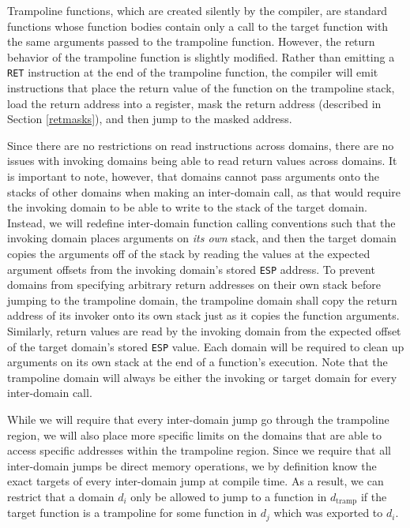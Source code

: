 \documentclass[12pt]{IEEEtran}
\begin{document}
Trampoline functions, which are created silently by the compiler, are standard functions whose function bodies contain only a call to the target function with the same arguments passed to the trampoline function. However, the return behavior of the trampoline function is slightly modified. Rather than emitting a \texttt{RET} instruction at the end of the trampoline function, the compiler will emit instructions that place the return value of the function on the trampoline stack, load the return address into a register, mask the return address (described in Section \ref{retmasks}), and then jump to the masked address.

Since there are no restrictions on read instructions across domains, there are no issues with invoking domains being able to read return values across domains. It is important to note, however, that domains cannot pass arguments onto the stacks of other domains when making an inter-domain call, as that would require the invoking domain to be able to write to the stack of the target domain. Instead, we will redefine inter-domain function calling conventions such that the invoking domain places arguments on \textit{its own} stack, and then the target domain copies the arguments off of the stack by reading the values at the expected argument offsets from the invoking domain's stored \texttt{ESP} address. To prevent domains from specifying arbitrary return addresses on their own stack before jumping to the trampoline domain, the trampoline domain shall copy the return address of its invoker onto its own stack just as it copies the function arguments. Similarly, return values are read by the invoking domain from the expected offset of the target domain's stored \texttt{ESP} value. Each domain will be required to clean up arguments on its own stack at the end of a function's execution. Note that the trampoline domain will always be either the invoking or target domain for every inter-domain call.

While we will require that every inter-domain jump go through the trampoline region, we will also place more specific limits on the domains that are able to access specific addresses within the trampoline region. Since we require that all inter-domain jumps be direct memory operations, we by definition know the exact targets of every inter-domain jump at compile time. As a result, we can restrict that a domain $d_i$ only be allowed to jump to a function in $d_\text{tramp}$ if the target function is a trampoline for some function in $d_j$ which was exported to $d_i$.
\end{document}
